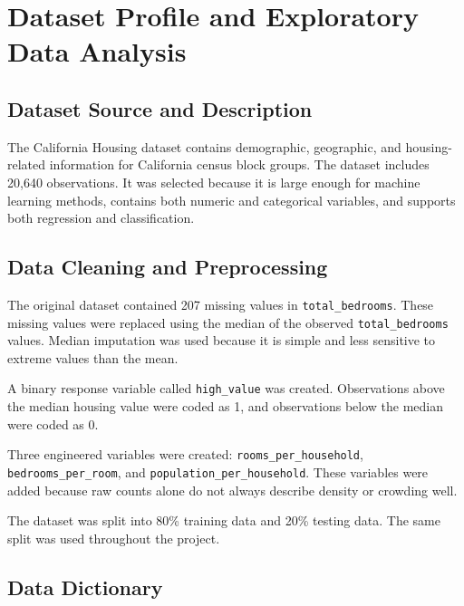 \documentclass[12pt]{report}
\begin{document}
\newpage

\chapter{Dataset Profile and Exploratory Data Analysis}

\section{Dataset Source and Description}

The California Housing dataset contains demographic, geographic, and housing-related information for California census block groups. The dataset includes 20,640 observations. It was selected because it is large enough for machine learning methods, contains both numeric and categorical variables, and supports both regression and classification.

\section{Data Cleaning and Preprocessing}

The original dataset contained 207 missing values in \texttt{total\_bedrooms}. These missing values were replaced using the median of the observed \texttt{total\_bedrooms} values. Median imputation was used because it is simple and less sensitive to extreme values than the mean.

A binary response variable called \texttt{high\_value} was created. Observations above the median housing value were coded as 1, and observations below the median were coded as 0.

Three engineered variables were created: \texttt{rooms\_per\_household}, \texttt{bedrooms\_per\_room}, and \texttt{population\_per\_household}. These variables were added because raw counts alone do not always describe density or crowding well.

The dataset was split into 80\% training data and 20\% testing data. The same split was used throughout the project.

\section{Data Dictionary}
\end{document}
